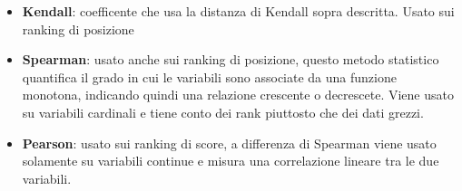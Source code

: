 \begin{itemize}
	\item \textbf{Kendall}: coefficente che usa la distanza di Kendall sopra descritta. Usato sui ranking di posizione
	\item \textbf{Spearman}: usato anche sui ranking di posizione, questo metodo statistico quantifica il grado in cui le variabili sono associate da una funzione monotona, indicando quindi una relazione crescente o decrescete. Viene usato su variabili cardinali e tiene conto dei rank piuttosto che dei dati grezzi.
	\item \textbf{Pearson}: usato sui ranking di score, a differenza di Spearman viene usato solamente su variabili continue e misura una correlazione lineare tra le due variabili.
\end{itemize}
